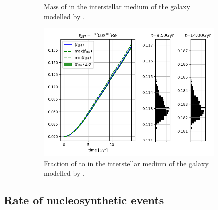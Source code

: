 \begin{figure}
\begin{subfigure}{\subfigwidth}
    \caption{ \label{fig:MCExperiment-delmax-os187}
      Mass of  in the interstellar medium of the galaxy modelled by \omegamodel.
    }
  \end{subfigure}
  \begin{subfigure}{\figwidth}
    \includegraphics[width=\linewidth]{results/MCExperiment_revised_2_delmax/combined_plot_div_decayed.png}
    \caption{ \label{fig:MCExperiment-delmax-div}
      Fraction of  to  in the interstellar medium of the galaxy modelled by \omegamodel.
    }
  \end{subfigure}
  \caption[\expone with \betadecay and removing negative isotope yields]{ \label{fig:MCExperiment-delmax}
  }
\end{figure}
\FloatBarrier %

\subsection{Rate of nucleosynthetic events}

